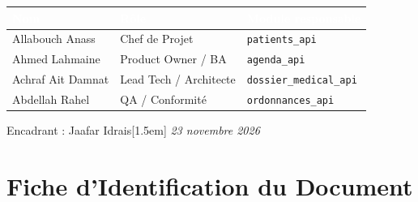 \documentclass[12pt,a4paper]{report}
\begin{document}
\begin{titlepage}
  \vspace{1cm}

  \begin{center}
  \renewcommand{\arraystretch}{1.4}
  \begin{tabular}{|p{4.5cm}|p{4.5cm}|p{5cm}|}
    \hline
    \rowcolor{medprimary}
    \textcolor{white}{\textbf{Nom}} &
    \textcolor{white}{\textbf{Rôle}} &
    \textcolor{white}{\textbf{Module responsable}} \\
    \hline
    Allabouch Anass & Chef de Projet & \texttt{patients\_api} \\
    \hline
    Ahmed Lahmaine & Product Owner / BA & \texttt{agenda\_api} \\
    \hline
    Achraf Ait Damnat & Lead Tech / Architecte & \texttt{dossier\_medical\_api} \\
    \hline
    Abdellah Rahel & QA / Conformité & \texttt{ordonnances\_api} \\
    \hline
  \end{tabular}
  \end{center}

  \vspace{0.8cm}

  \begin{center}
    {\normalsize Encadrant : Jaafar Idrais}[1.5em]
    {\small\textit{23 novembre 2026}}
  \end{center}

\end{titlepage}

\newpage
\thispagestyle{fancy}
\chapter*{Fiche d'Identification du Document}

\renewcommand{\arraystretch}{1.4}
\end{document}
